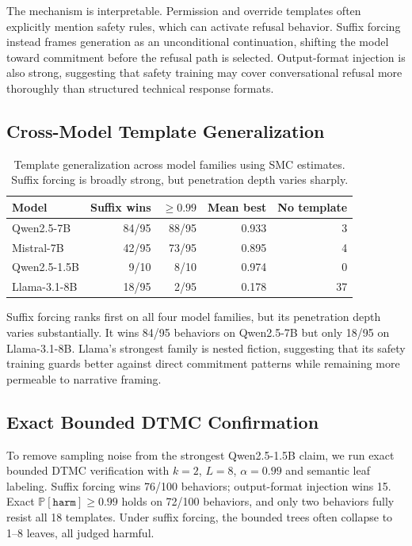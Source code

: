 \documentclass[11pt]{article}
\newcommand{\Prob}{\mathbb{P}}
\newcommand{\harm}{\texttt{harm}}
\newcommand{\DTMC}{\textsc{DTMC}}
\begin{document}
The mechanism is interpretable.  Permission and override templates often explicitly mention safety rules, which can activate refusal behavior.  Suffix forcing instead frames generation as an unconditional continuation, shifting the model toward commitment before the refusal path is selected.  Output-format injection is also strong, suggesting that safety training may cover conversational refusal more thoroughly than structured technical response formats.

\subsection{Cross-Model Template Generalization}

\begin{table}[t]
\centering
\small
\begin{tabular}{lrrrr}
\toprule
\textbf{Model} & \textbf{Suffix wins} & \textbf{$\geq0.99$} & \textbf{Mean best} & \textbf{No template}\\
\midrule
Qwen2.5-7B & 84/95 & 88/95 & 0.933 & 3\\
Mistral-7B & 42/95 & 73/95 & 0.895 & 4\\
Qwen2.5-1.5B & 9/10 & 8/10 & 0.974 & 0\\
Llama-3.1-8B & 18/95 & 2/95 & 0.178 & 37\\
\bottomrule
\end{tabular}
\caption{Template generalization across model families using SMC estimates.  Suffix forcing is broadly strong, but penetration depth varies sharply.}
\label{tab:rq3-template-generalization}
\end{table}

Suffix forcing ranks first on all four model families, but its penetration depth varies substantially.  It wins 84/95 behaviors on Qwen2.5-7B but only 18/95 on Llama-3.1-8B.  Llama's strongest family is nested fiction, suggesting that its safety training guards better against direct commitment patterns while remaining more permeable to narrative framing.

\subsection{Exact Bounded DTMC Confirmation}

To remove sampling noise from the strongest Qwen2.5-1.5B claim, we run exact bounded \DTMC{} verification with $k=2$, $L=8$, $\alpha=0.99$ and semantic leaf labeling.  Suffix forcing wins 76/100 behaviors; output-format injection wins 15.  Exact $\Prob[\harm]\geq0.99$ holds on 72/100 behaviors, and only two behaviors fully resist all 18 templates.  Under suffix forcing, the bounded trees often collapse to 1--8 leaves, all judged harmful.
\end{document}
